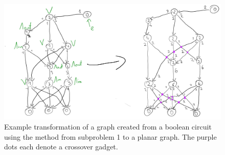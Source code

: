 \begin{figure}[H]
      \centering
      \caption{Example transformation of a graph created from a boolean circuit using the method
      from subproblem 1 to a planar graph. The purple dots each denote a crossover gadget.}
      \includegraphics[scale=0.1]{content/graphics/game20.png}
\end{figure}

